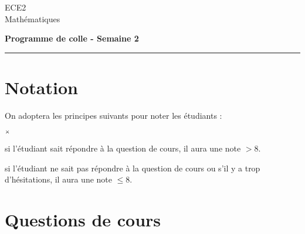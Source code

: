 \documentclass[11pt]{article}%
\begin{document}
\begin{flushleft}
ECE2 \\
Mathématiques
\end{flushleft}


\vspace{0.1cm}

\begin{center}
\textbf{\Large{Programme de colle - Semaine 2}}
\end{center}

\hrule

\vspace*{0,2cm}

\section*{Notation}

On adoptera les principes suivants pour noter les étudiants :
\begin{noliste}{$\scriptstyle \times$}
\item si l'étudiant sait répondre à la question de cours, il 
aura une note $> 8$.
\item si l'étudiant ne sait pas répondre à la question de 
cours ou s'il y a trop d'hésitations, il aura une note $\leq 8$.
\end{noliste}

\section*{Questions de cours}
\end{document}
